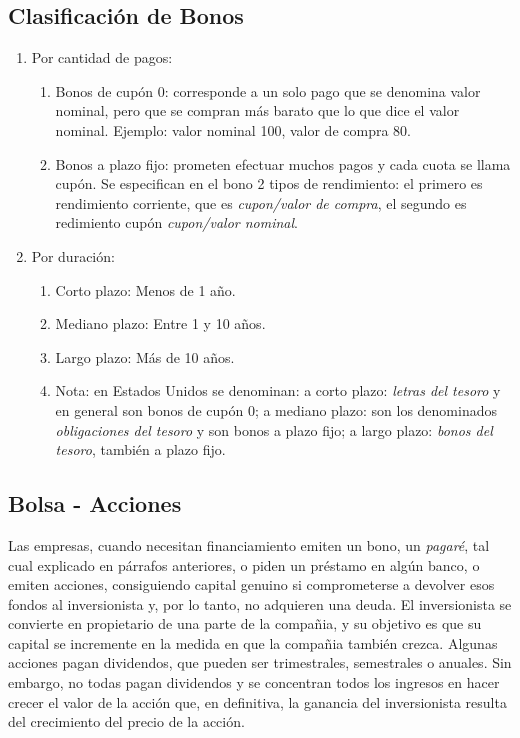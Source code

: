 \subsection{Clasificación de Bonos}

\begin{enumerate}
    \item Por cantidad de pagos:
          \begin{enumerate}
              \item Bonos de cupón 0:
                    corresponde a un solo pago que se denomina valor nominal,
                    pero que se compran más barato que lo que dice
                    el valor nominal.
                    Ejemplo: valor nominal 100, valor de compra 80.
              \item Bonos a plazo fijo:
                    prometen efectuar muchos pagos y cada cuota se llama cupón.
                    Se especifican en el bono 2 tipos de rendimiento:
                    el primero es rendimiento corriente, que es
                    \textit{cupon/valor de compra},
                    el segundo es redimiento cupón \textit{cupon/valor nominal}.
          \end{enumerate}
    \item Por duración:
          \begin{enumerate}
              \item Corto plazo: Menos de 1 año.
              \item Mediano plazo: Entre 1 y 10 años.
              \item Largo plazo: Más de 10 años.
              \item Nota:
                    en Estados Unidos se denominan: 
                    a corto plazo: \emph{letras del tesoro}
                    y en general son bonos de cupón 0; 
                    a mediano plazo: son los denominados
                    \emph{obligaciones del tesoro} y son bonos a plazo fijo; 
                    a largo plazo:
                    \emph{bonos del tesoro}, también a plazo fijo.
          \end{enumerate}
\end{enumerate}

\subsection{Bolsa - Acciones}

Las empresas,
cuando necesitan financiamiento emiten un bono, 
un \emph{pagaré},
tal cual explicado en párrafos anteriores, 
o piden un préstamo en algún banco,
o emiten acciones, 
consiguiendo capital genuino si comprometerse a devolver esos fondos 
al inversionista y, por lo tanto, no adquieren una deuda. 
El inversionista se convierte en propietario de una parte de la compañia, 
y su objetivo es que su capital se incremente 
en la medida en que la compañia también crezca. 
Algunas acciones pagan dividendos, 
que pueden ser trimestrales, 
semestrales o anuales. 
Sin embargo, 
no todas pagan dividendos 
y se concentran todos los ingresos en hacer crecer el valor de la acción que,
en definitiva, 
la ganancia del inversionista resulta del crecimiento del precio de la acción.

